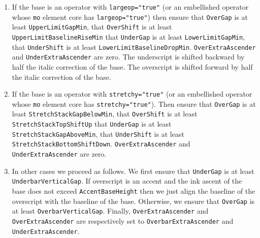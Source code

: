 \begin{enumerate}
\item If the base is an operator with {\tt largeop="true"}
  (or an embellished operator whose {\tt mo} element core has
  {\tt largeop="true"}) then ensure that {\tt OverGap} is at least
  {\tt UpperLimitGapMin}, that {\tt OverShift} is at least
  {\tt UpperLimitBaselineRiseMin} that {\tt UnderGap} is at
  least
  {\tt LowerLimitGapMin}, that {\tt UnderShift} is at least
  {\tt LowerLimitBaselineDropMin}.
  {\tt OverExtraAscender} and
  {\tt UnderExtraAscender} are zero. The
  underscript is shifted backward by half the italic correction of the base.
  The overscript is shifted forward by half the italic correction of the base.
\item If the base is an operator with {\tt stretchy="true"}
  (or an embellished operator whose {\tt mo} element core has
  {\tt stretchy="true"}). Then ensure that {\tt OverGap} is at least
  {\tt StretchStackGapBelowMin}, that {\tt OverShift} is at
  least
  {\tt StretchStackTopShiftUp} that {\tt UnderGap} is at least
  {\tt StretchStackGapAboveMin},
  that {\tt UnderShift} is at least
  {\tt StretchStackBottomShiftDown}.
  {\tt OverExtraAscender} and
  {\tt UnderExtraAscender} are zero.
\item In other cases we proceed as follows.
  We first ensure that {\tt UnderGap} is at least
  {\tt UnderbarVerticalGap}.
  If overscript is an accent
  and the ink ascent of the base does not exceed
  {\tt AccentBaseHeight}
  then we just align the baseline of the overscript with the baseline
  of the base. Otherwise, we ensure that {\tt OverGap} is at least
  {\tt OverbarVerticalGap}. Finally,
  {\tt OverExtraAscender} and
  {\tt OverExtraAscender} are respectively set to
  {\tt OverbarExtraAscender}
  and {\tt UnderExtraAscender}.
\end{enumerate}

